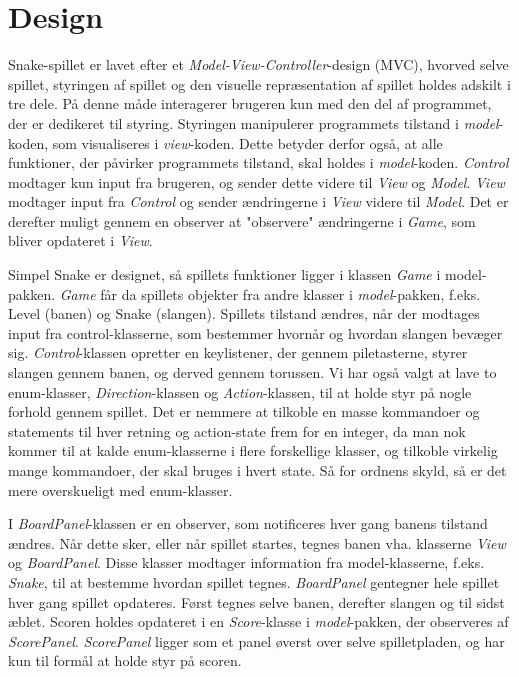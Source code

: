 \section{Design}
Snake-spillet er lavet efter et \textit{Model-View-Controller}-design (MVC), hvorved selve spillet, styringen af spillet og den visuelle repræsentation af spillet holdes adskilt i tre dele. På denne måde interagerer brugeren kun med den del af programmet, der er dedikeret til styring. Styringen manipulerer programmets tilstand i \textit{model}-koden, som visualiseres i \textit{view}-koden. Dette betyder derfor også, at alle funktioner, der påvirker programmets tilstand, skal holdes i \textit{model}-koden. \textit{Control} modtager kun input fra brugeren, og sender dette videre til \textit{View} og \textit{Model}. \textit{View} modtager input fra \textit{Control} og sender ændringerne i \textit{View} videre til \textit{Model}. Det er derefter muligt gennem en observer at "observere" ændringerne i \textit{Game}, som bliver opdateret i \textit{View}.

Simpel Snake er designet, så spillets funktioner ligger i klassen \textit{Game} i model-pakken. \textit{Game} får da spillets objekter fra andre klasser i \textit{model}-pakken, f.eks. Level (banen) og Snake (slangen). Spillets tilstand ændres, når der modtages input fra control-klasserne, som bestemmer hvornår og hvordan slangen bevæger sig. \textit{Control}-klassen opretter en keylistener, der gennem piletasterne, styrer slangen gennem banen, og derved gennem torussen. Vi har også valgt at lave to enum-klasser, \textit{Direction}-klassen og \textit{Action}-klassen, til at holde styr på nogle forhold gennem spillet. Det er nemmere at tilkoble en masse kommandoer og statements til hver retning og action-state frem for en integer, da man nok kommer til at kalde enum-klasserne i flere forskellige klasser, og tilkoble virkelig mange kommandoer, der skal bruges i hvert state. Så for ordnens skyld, så er det mere overskueligt med enum-klasser.

I \textit{BoardPanel}-klassen er en observer, som notificeres hver gang banens tilstand ændres. Når dette sker, eller når spillet startes, tegnes banen vha. klasserne \textit{View} og \textit{BoardPanel}. Disse klasser modtager information fra model-klasserne, f.eks. \textit{Snake}, til at bestemme hvordan spillet tegnes. \textit{BoardPanel} gentegner hele spillet hver gang spillet opdateres. Først tegnes selve banen, derefter slangen og til sidst æblet. 
Scoren holdes opdateret i en \textit{Score}-klasse i \textit{model}-pakken, der observeres af \textit{ScorePanel}. \textit{ScorePanel} ligger som et panel øverst over selve spilletpladen, og har kun til formål at holde styr på scoren.

